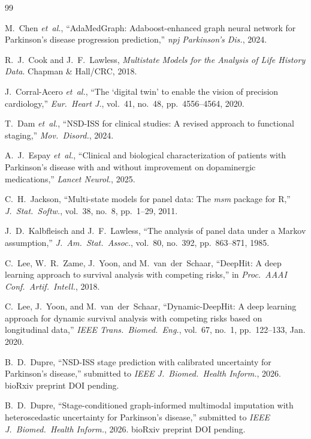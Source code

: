 \begin{thebibliography}{99}

M.~Chen \textit{et~al.}, ``AdaMedGraph: Adaboost-enhanced graph neural network for Parkinson's disease progression prediction,'' \textit{npj Parkinson's Dis.}, 2024.

R.~J.~Cook and J.~F.~Lawless, \textit{Multistate Models for the Analysis of Life History Data}. Chapman \& Hall/CRC, 2018.

J.~Corral-Acero \textit{et~al.}, ``The `digital twin' to enable the vision of precision cardiology,'' \textit{Eur.\ Heart J.}, vol.~41, no.~48, pp.~4556--4564, 2020.

T.~Dam \textit{et~al.}, ``NSD-ISS for clinical studies: A revised approach to functional staging,'' \textit{Mov.\ Disord.}, 2024.

A.~J.~Espay \textit{et~al.}, ``Clinical and biological characterization of patients with Parkinson's disease with and without improvement on dopaminergic medications,'' \textit{Lancet Neurol.}, 2025.

C.~H.~Jackson, ``Multi-state models for panel data: The \textit{msm} package for R,'' \textit{J.\ Stat.\ Softw.}, vol.~38, no.~8, pp.~1--29, 2011.

J.~D.~Kalbfleisch and J.~F.~Lawless, ``The analysis of panel data under a Markov assumption,'' \textit{J.\ Am.\ Stat.\ Assoc.}, vol.~80, no.~392, pp.~863--871, 1985.

C.~Lee, W.~R.~Zame, J.~Yoon, and M.~van~der~Schaar, ``DeepHit: A deep learning approach to survival analysis with competing risks,'' in \textit{Proc.\ AAAI Conf.\ Artif.\ Intell.}, 2018.

C.~Lee, J.~Yoon, and M.~van~der~Schaar, ``Dynamic-DeepHit: A deep learning approach for dynamic survival analysis with competing risks based on longitudinal data,'' \textit{IEEE Trans.\ Biomed.\ Eng.}, vol.~67, no.~1, pp.~122--133, Jan. 2020.

B.~D.~Dupre, ``NSD-ISS stage prediction with calibrated uncertainty for Parkinson's disease,'' submitted to \textit{IEEE J.\ Biomed.\ Health Inform.}, 2026. bioRxiv preprint DOI pending.

B.~D.~Dupre, ``Stage-conditioned graph-informed multimodal imputation with heteroscedastic uncertainty for Parkinson's disease,'' submitted to \textit{IEEE J.\ Biomed.\ Health Inform.}, 2026. bioRxiv preprint DOI pending.


\end{thebibliography}
